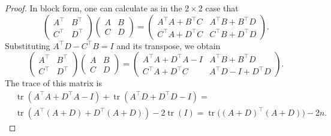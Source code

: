 \documentclass[10pt,a4paper]{amsart}
\newcommand{\tr}{\operatorname{tr}}
\begin{document}
\begin{proof}
In block form, one can calculate as in the $2 \times 2$ case that
\[
\begin{pmatrix} A^{\top} & B^{\top} \\ C^{\top} & D^{\top} \end{pmatrix}\begin{pmatrix} A & B \\ C & D \end{pmatrix}
=
\begin{pmatrix}
A^\top A+B^\top C & A^\top B + B^\top D \\ C^\top A+ D^\top C& C^\top B + D^\top D
\end{pmatrix}
.
\]
Substituting $A^{\top}D - C^{\top}B = I$ and its transpose, we obtain
\[
\begin{pmatrix} A^{\top} & B^{\top} \\ C^{\top} & D^{\top} \end{pmatrix}\begin{pmatrix} A & B \\ C & D \end{pmatrix}
=
\begin{pmatrix}
A^\top A+D^\top A-I & A^\top B + B^\top D \\ C^\top A+ D^\top C& A^\top D-I + D^\top D
\end{pmatrix}
.
\]
The trace of this matrix is
\begin{align*}
&\tr(A^\top A + D^\top A-I) + \tr(A^\top D + D^\top D - I) = \\
&\tr(A^\top (A+D) + D^\top (A+D)) - 2\tr(I) = \tr\big( (A+D)^\top (A+D) \big) - 2n.
\end{align*}
\end{proof}
\end{document}

